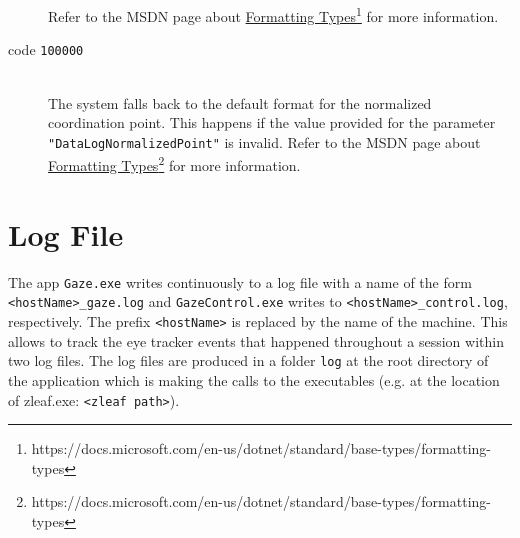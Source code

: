 \documentclass[a4paper,oneside]{book}
\begin{document}
\begin{description}
        Refer to the MSDN page about \href{https://docs.microsoft.com/en-us/dotnet/standard/base-types/formatting-types}{Formatting Types}\footnote{https://docs.microsoft.com/en-us/dotnet/standard/base-types/formatting-types} for more information.
    \item[code \texttt{100000}] \hfill \\
        The system falls back to the default format for the normalized coordination point.
        This happens if the value provided for the parameter \texttt{"DataLogNormalizedPoint"} is invalid.
        Refer to the MSDN page about \href{https://docs.microsoft.com/en-us/dotnet/standard/base-types/formatting-types}{Formatting Types}\footnote{https://docs.microsoft.com/en-us/dotnet/standard/base-types/formatting-types} for more information.
\end{description}

\section{Log File}
The app \texttt{Gaze.exe} writes continuously to a log file with a name of the form \texttt{<hostName>\_gaze.log} and \texttt{GazeControl.exe} writes to \texttt{<hostName>\_control.log}, respectively.
The prefix \texttt{<hostName>} is replaced by the name of the machine.
This allows to track the eye tracker events that happened throughout a session within two log files.
The log files are produced in a folder \texttt{log} at the root directory of the application which is making the calls to the executables (e.g. at the location of zleaf.exe: \texttt{<zleaf path>}).
\end{document}
